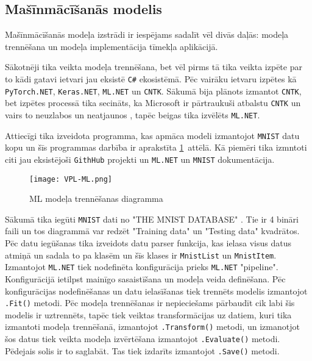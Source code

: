 \subsection{Mašīnmācīšanās modelis}

    Mašīnmācīšanās modeļa izstrādi ir iespējams sadalīt vēl divās daļās: modeļa trennēšana un modeļa
    implementācija tīmekļa aplikācijā.

    Sākotnēji tika veikta modeļa trennēšana, bet vēl pirms tā tika veikta izpēte par to kādi gatavi
    ietvari jau eksistē \texttt{C\#} ekosistēmā. Pēc vairāku ietvaru izpētes kā \texttt{PyTorch.NET},
    \texttt{Keras.NET}, \texttt{ML.NET} un \texttt{CNTK}. Sākumā bija plānots izmantot \texttt{CNTK},
    bet izpētes processā tika secināts, ka Microsoft ir pārtraukuši atbalstu \texttt{CNTK} un vairs
    to neuzlabos un neatjaunos \cite{chrisbasogluCNTKReleaseNotes}, tapēc beigas tika izvēlēts \texttt{ML.NET}.

    Attiecīgi tika izveidota programma, kas apmāca modeli izmantojot \texttt{MNIST} datu kopu un
    šīs programmas darbība ir aprakstīta \ref{ml:train}~attēlā. Kā piemēri tika izmntoti citi jau
    eksistējoši \texttt{GithHub} projekti un \texttt{ML.NET} un \texttt{MNIST} dokumentācija.
    \cite{DotnetMachinelearningsamples2021} \cite{kexugitTestRunWorking} \cite{MLNETTutorial}
    \cite{natkeMLNETDocumentation} \cite{paxbunPaxbunCntkMnistPractice2019}

    \begin{figure}[H]
        \centering
        \texttt{[image: VPL-ML.png]}
        \caption{ML modeļa trennēšanas diagramma}
        \label{ml:train}
    \end{figure}

    Sākumā tika iegūti \texttt{MNIST} dati no "THE MNIST DATABASE" \cite{MNISTHandwrittenDigit}. Tie ir
    4 bināri faili un tos diagrammā var redzēt "Training data" un "Testing data" kvadrātos. Pēc datu iegūšanas
    tika izveidots datu parser funkcija, kas ielasa visus datus atmiņā un sadala to pa klasēm un šīs
    klases ir \texttt{MnistList} un \texttt{MnistItem}. Izmantojot \texttt{ML.NET} tiek nodefinēta
    konfigurācija prieks \texttt{ML.NET} "pipeline". Konfigurācijā ietilpst mainīgo sasaistīšana un
    modeļa veida definēšana. Pēc konfigurācijas nodefinēšanas un datu ielasīšanas tiek trennēts modelis
    izmantojot \texttt{.Fit()} metodi. Pēc modeļa trennēšanas ir nepieciešams pārbaudīt cik labi šis
    modelis ir uztrennēts, tapēc tiek veiktas transformācijas uz datiem, kuri tika izmantoti modeļa
    trennēšanā, izmantojot \texttt{.Transform()} metodi, un izmanotjot šos datus tiek veikta modeļa
    izvērtēšana izmantojot \texttt{.Evaluate()} metodi. Pēdejais solis ir to saglabāt. Tas tiek izdarīts
    izmantojot \texttt{.Save()} metodi.

